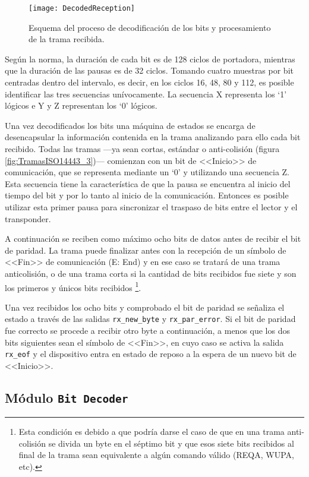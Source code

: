 \begin{figure}
	\centering
	\texttt{[image: DecodedReception]}
	\caption{Esquema del proceso de decodificación de los bits y 
	procesamiento de la trama recibida.}
	\label{fig:DecodedReception}
\end{figure}

Según la norma, la duración de cada bit es de 128 ciclos de 
portadora, mientras que la duración de las pausas es de 32 ciclos. 
Tomando cuatro muestras por bit centradas dentro del intervalo, es 
decir, en los ciclos 16, 48, 80 y 112, es posible identificar las 
tres secuencias unívocamente. La secuencia X representa los `1' 
lógicos e Y y Z representan los `0' lógicos.

Una vez decodificados los bits una máquina de estados se encarga de desencapsular la 
información contenida en la trama analizando para ello cada bit 
recibido. Todas las tramas ---ya sean cortas, estándar o anti-colisión 
(figura \ref{fig:TramasISO14443_3})--- comienzan con un bit de 
<<Inicio>> de comunicación, que se representa mediante un `0' y 
utilizando una secuencia Z. Esta secuencia tiene la característica de 
que la pausa se encuentra al inicio del tiempo del bit y por lo tanto 
al inicio de la comunicación. Entonces es posible utilizar esta primer 
pausa para sincronizar el traspaso de bits entre el lector y el 
transponder.

A continuación se reciben como máximo ocho bits de datos antes de 
recibir el bit de paridad. La trama puede finalizar antes con la 
recepción de un símbolo de <<Fin>> de comunicación (E: End) y en ese 
caso se tratará de una trama anticolisión, o de una trama corta si la 
cantidad de bits recibidos fue siete y son los primeros y únicos 
bits recibidos \footnote{Esta condición es debido a que podría darse 
el caso de que en una trama anti-colisión se divida un byte en el 
séptimo bit y que esos siete bits recibidos al final de la trama
sean equivalente a algún comando válido (REQA, WUPA, etc).}.

Una vez recibidos los ocho bits y comprobado el bit de paridad se 
señaliza el estado a través de las salidas \lstinline{rx_new_byte} y 
\lstinline{rx_par_error}. Si el bit de paridad fue correcto se procede 
a recibir otro byte a continuación, a menos que los dos bits 
siguientes sean el símbolo de <<Fin>>, en cuyo caso se activa la 
salida \lstinline{rx_eof} y el dispositivo entra en estado de reposo a 
la espera de un nuevo bit de <<Inicio>>.


\subsection{Módulo \lstinline{Bit Decoder}}

